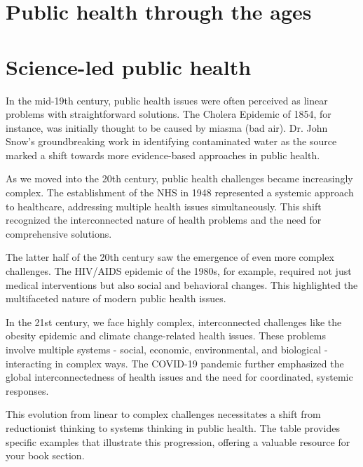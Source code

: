\section{Public health through the ages}

\section{Science-led public health}
In the mid-19th century, public health issues were often perceived as linear problems with straightforward solutions. The Cholera Epidemic of 1854, for instance, was initially thought to be caused by miasma (bad air). Dr. John Snow's groundbreaking work in identifying contaminated water as the source marked a shift towards more evidence-based approaches in public health. 

As we moved into the 20th century, public health challenges became increasingly complex. The establishment of the NHS in 1948 represented a systemic approach to healthcare, addressing multiple health issues simultaneously. This shift recognized the interconnected nature of health problems and the need for comprehensive solutions. 

The latter half of the 20th century saw the emergence of even more complex challenges. The HIV/AIDS epidemic of the 1980s, for example, required not just medical interventions but also social and behavioral changes. This highlighted the multifaceted nature of modern public health issues. 

In the 21st century, we face highly complex, interconnected challenges like the obesity epidemic and climate change-related health issues. These problems involve multiple systems - social, economic, environmental, and biological - interacting in complex ways. The COVID-19 pandemic further emphasized the global interconnectedness of health issues and the need for coordinated, systemic responses. 

This evolution from linear to complex challenges necessitates a shift from reductionist thinking to systems thinking in public health. The table provides specific examples that illustrate this progression, offering a valuable resource for your book section.

